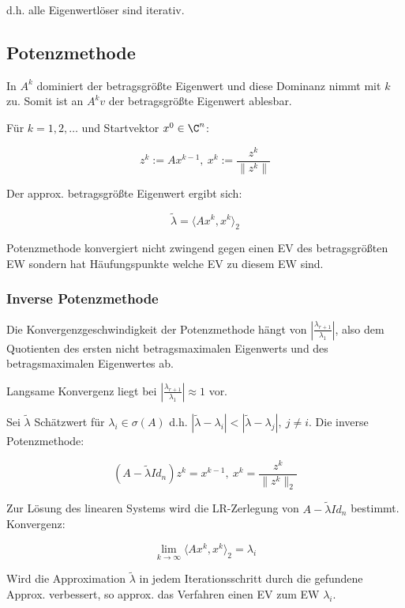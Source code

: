d.h. alle Eigenwertlöser sind iterativ.

\subsection*{Potenzmethode}

In $A^k$ dominiert der betragsgrößte Eigenwert und diese Dominanz nimmt mit $k$ zu. Somit ist an $A^k v$ der betragsgrößte Eigenwert ablesbar.

Für $k = 1, 2, \dots$ und Startvektor $x^0 \in \C^n$:

\vspace*{-2mm}
\[ z^k := Ax^{k-1}, \ x^k := \frac{z^k}{\|z^k\|} \]

Der approx. betragsgrößte Eigenwert ergibt sich:

\vspace*{-2mm}
\[ \tilde\lambda = \langle Ax^k,x^k \rangle_2 \]

Potenzmethode konvergiert nicht zwingend gegen einen EV des betragsgrößten EW sondern hat Häufungspunkte welche EV zu diesem EW sind.

\subsubsection*{Inverse Potenzmethode}

Die Konvergenzgeschwindigkeit der Potenzmethode hängt von $|\frac{\lambda_{r+1}}{\lambda_1}|$, also dem Quotienten des ersten nicht betragsmaximalen Eigenwerts und des betragsmaximalen Eigenwertes ab.

Langsame Konvergenz liegt bei $|\frac{\lambda_{r+1}}{\lambda_1}| \approx 1$ vor.

\spacing

Sei $\tilde\lambda$ Schätzwert für $\lambda_i \in \sigma(A)$ d.h. $|\tilde\lambda - \lambda_i| < |\tilde\lambda - \lambda_j|, \ j \neq i$. Die inverse Potenzmethode:

\vspace*{-2mm}
\[ (A-\tilde\lambda Id_n)z^k = x^{k-1}, \ x^k = \frac{z^k}{\|z^k\|_2} \]

Zur Lösung des linearen Systems wird die LR-Zerlegung von $A- \tilde\lambda Id_n$ bestimmt. Konvergenz:

\vspace*{-2mm}
\[ \lim_{k\to\infty} \langle Ax^k,x^k \rangle_2 = \lambda_i \]

Wird die Approximation $\tilde\lambda$ in jedem Iterationsschritt durch die gefundene Approx. verbessert, so approx. das Verfahren einen EV zum EW $\lambda_i$.


